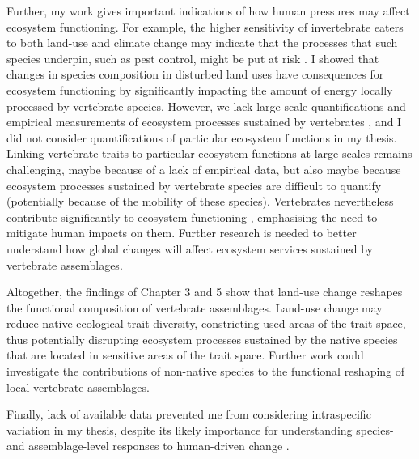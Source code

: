 Further, my work gives important indications of how human pressures may affect ecosystem functioning. For example, the higher sensitivity of invertebrate eaters to both land-use and climate change may indicate that the processes that such species underpin, such as pest control, might be put at risk \citep{Civantos2012}. I showed that changes in species composition in disturbed land uses have consequences for ecosystem functioning by significantly impacting the amount of energy locally processed by vertebrate species. However, we lack large-scale quantifications and empirical measurements of ecosystem processes sustained by vertebrates \citep{Wenny2011, Luck2012}, and I did not consider quantifications of particular ecosystem functions in my thesis. Linking vertebrate traits to particular ecosystem functions at large scales remains challenging, maybe because of a lack of empirical data, but also maybe because ecosystem processes sustained by vertebrate species are difficult to quantify (potentially because of the mobility of these species). Vertebrates nevertheless contribute significantly to ecosystem functioning \citep{Wandrag2015, Breviglieri2017, Ratto2018, Zhang2018_trophicinter}, emphasising the need to mitigate human impacts on them. Further research is needed to better understand how global changes will affect ecosystem services sustained by vertebrate assemblages. 

Altogether, the findings of Chapter 3 and 5 show that land-use change reshapes the functional composition of vertebrate assemblages. Land-use change may reduce native ecological trait diversity, constricting used areas of the trait space, thus potentially disrupting ecosystem processes sustained by the native species that are located in sensitive areas of the trait space. Further work could investigate the contributions of non-native species to the functional reshaping of local vertebrate assemblages.

Finally, lack of available data prevented me from considering intraspecific variation in my thesis, despite its likely importance for understanding species- and assemblage-level responses to human-driven change \citep{Carlson2014, Guralnick2016, Rohr2018}. %


